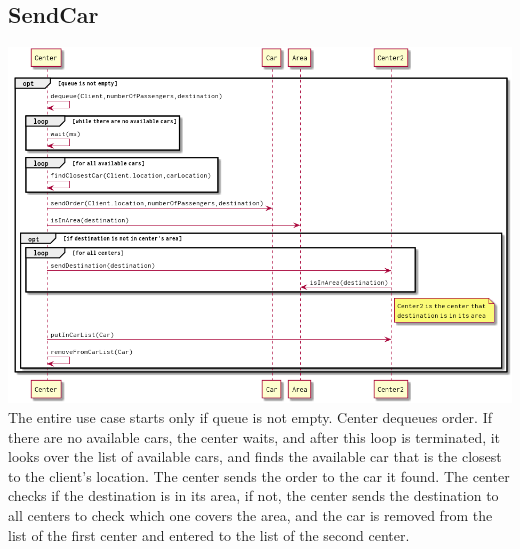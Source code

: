 \documentclass[a4paper]{article}
\begin{document}
\subsection*{SendCar}
\includegraphics[width=1\textwidth]{../Diagrams/sendCar.png}\\
The entire use case starts only if queue is not empty. Center dequeues order. If there are no available cars, the center waits, and after this loop is terminated, it looks over the list of available cars, and finds the available car that is the closest to the client's location. The center sends the order to the car it found. The center checks if the destination is in its area, if not, the center sends the destination to all centers to check which one covers the area, and the car is removed from the list of the first center and entered to the list of the second center. 
\end{document}
